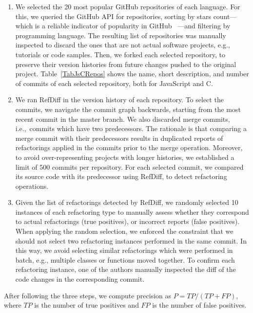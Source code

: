 \begin{enumerate}  
\item We selected the 20 most popular GitHub repositories of each language. For this, we queried the GitHub API for repositories, sorting by stars count---which is a reliable indicator of popularity in GitHub~\cite{icsme2016,jss-2018-github-stars} ---and filtering by programming language.
The resulting list of repositories was manually inspected to discard the ones that are not actual software projects, e.g., tutorials or code samples. Then, we forked each selected repository, to preserve their version histories from future changes pushed to the original project. Table~\ref{TabJsCRepos} shows the name, short description, and number of commits of each selected repository, both for JavaScript and C.

\item We ran RefDiff in the version history of each repository. To select the commits, we navigate the commit graph backwards, starting from the most recent commit in the master branch. We also discarded merge commits, i.e.,~commits which have two predecessors. The rationale is that comparing a merge commit with their predecessors results in duplicated reports of refactorings applied in the commits prior to the merge operation. Moreover, to avoid over-representing projects with longer histories, we established a limit of 500 commits per repository. For each selected commit, we compared its source code with its predecessor using RefDiff, to detect refactoring operations.

\item Given the list of refactorings detected by RefDiff, we randomly selected 10 instances of each refactoring type to manually assess whether they correspond to actual refactorings (true positives), or incorrect reports (false positives).
When applying the random selection, we enforced the constraint that we should not select two refactoring instances performed in the same commit.
In this way, we avoid selecting similar refactorings which were performed in batch, e.g., multiple classes or functions moved together.
To confirm each refactoring instance, one of the authors manually inspected the diff of the code changes in the corresponding commit.
\end{enumerate}

After following the three steps, we compute precision as $P = \mathit{TP} / (\mathit{TP} + \mathit{FP})$, where $\mathit{TP}$ is the number of true positives and $\mathit{FP}$ is the number of false positives.



